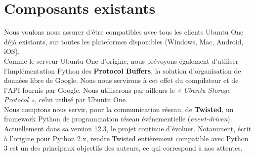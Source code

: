 \section{Composants existants}
\thispagestyle{EIP} %
Nous voulons nous assurer d'être compatibles avec tous les clients Ubuntu One déjà existants, sur toutes les plateformes disponibles (Windows, Mac, Android, iOS).\\

Comme le serveur Ubuntu One d'origine, nous prévoyons également d'utiliser l'implémentation Python des \textbf{Protocol Buffers}, la solution d'organisation de données libre de Google. Nous nous servirons à cet effet du compilateur et de l'API fournis par Google. Nous utiliserons par ailleurs le \emph{« Ubuntu Storage Protocol »}, celui utilisé par Ubuntu One.\\

Nous comptons nous servir, pour la communication réseau, de \textbf{Twisted}, un framework Python de programmation réseau événementielle (\emph{event-driven}). Actuellement dans sa version 12.3, le projet continue d'évoluer. Notamment, écrit à l'origine pour Python 2.x, rendre Twisted entièrement compatible avec Python 3 est un des principaux objectifs des auteurs, ce qui correspond à nos attentes.

